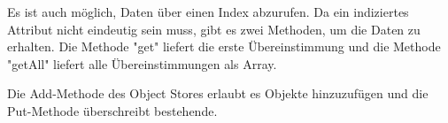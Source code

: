 
Es ist auch möglich, Daten über einen Index abzurufen. Da ein indiziertes 
Attribut nicht eindeutig sein muss, gibt es zwei Methoden, um die Daten zu erhalten. Die Methode "get" liefert die erste Übereinstimmung und die Methode "getAll" liefert alle Übereinstimmungen als Array.


Die Add-Methode des Object Stores erlaubt es Objekte hinzuzufügen und die Put-Methode überschreibt bestehende.
\cite{MDNIndexedDB}
\cite{MDNUsingIndexedDB}